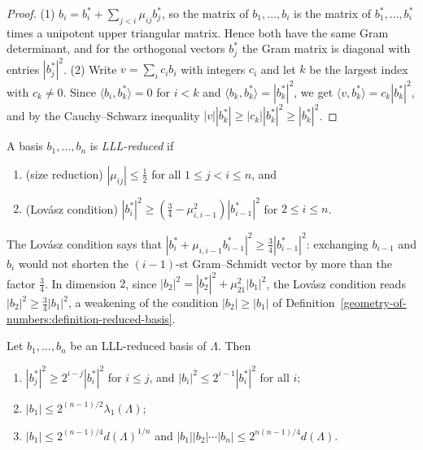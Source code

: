 \begin{proof}
(1) $b_i = b_i^* + \sum_{j<i}\mu_{ij}b_j^*$, so the matrix of $b_1, \ldots, b_i$ is the matrix of $b_1^*, \ldots, b_i^*$ times a unipotent upper triangular matrix. Hence both have the same Gram
determinant, and for the orthogonal vectors $b_j^*$ the Gram matrix is diagonal with entries $|b_j^*|^2$. (2) Write $v = \sum_ic_ib_i$ with integers $c_i$ and let $k$ be the largest index with $c_k \neq 0$.
Since $\langle b_i, b_k^* \rangle = 0$ for $i < k$ and $\langle b_k, b_k^* \rangle = |b_k^*|^2$, we get $\langle v, b_k^* \rangle = c_k|b_k^*|^2$, and by the Cauchy--Schwarz inequality
$|v||b_k^*| \geq |c_k||b_k^*|^2 \geq |b_k^*|^2$.
\end{proof}

\begin{definition}\label{geometry-of-numbers:definition-lll}
A basis $b_1, \ldots, b_n$ is \emph{LLL-reduced} if
\begin{enumerate}
\item (size reduction) $|\mu_{ij}| \leq \frac12$ for all $1 \leq j < i \leq n$, and
\item (Lov\'asz condition) $|b_i^*|^2 \geq (\frac34 - \mu_{i,i-1}^2)|b_{i-1}^*|^2$ for $2 \leq i \leq n$.
\end{enumerate}
\end{definition}

The Lov\'asz condition says that $|b_i^* + \mu_{i,i-1}b_{i-1}^*|^2 \geq \frac34|b_{i-1}^*|^2$: exchanging $b_{i-1}$ and $b_i$ would not shorten the $(i-1)$-st Gram--Schmidt vector by more than the
factor $\frac34$. In dimension $2$, since $|b_2|^2 = |b_2^*|^2 + \mu_{21}^2|b_1|^2$, the Lov\'asz condition reads $|b_2|^2 \geq \frac34|b_1|^2$, a weakening of the condition $|b_2| \geq |b_1|$ of
Definition~\ref{geometry-of-numbers:definition-reduced-basis}.

\begin{proposition}\label{geometry-of-numbers:proposition-lll-properties}
Let $b_1, \ldots, b_n$ be an LLL-reduced basis of $\Lambda$. Then
\begin{enumerate}
\item $|b_j^*|^2 \geq 2^{i-j}|b_i^*|^2$ for $i \leq j$, and $|b_i|^2 \leq 2^{i-1}|b_i^*|^2$ for all $i$;
\item $|b_1| \leq 2^{(n-1)/2}\lambda_1(\Lambda)$;
\item $|b_1| \leq 2^{(n-1)/4}d(\Lambda)^{1/n}$ and $|b_1||b_2|\cdots|b_n| \leq 2^{n(n-1)/4}d(\Lambda)$.
\end{enumerate}
\end{proposition}

